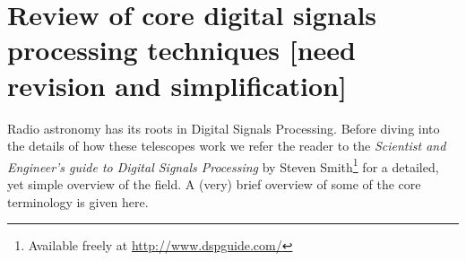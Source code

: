 \documentclass[a4paper,10pt]{report}
\begin{document}
% 
%  
 \section{Review of core digital signals processing techniques [need revision and simplification]}
Radio astronomy has its roots in Digital Signals Processing. Before diving into the details of how these telescopes work we refer the reader to the \textit{Scientist and Engineer's guide to Digital Signals Processing} by 
Steven Smith\footnote{Available freely at \url{http://www.dspguide.com/}}\cite{smith1997scientist} for a detailed, yet simple overview of the field. A (very) brief overview of some of the core terminology is given here.
\end{document}
